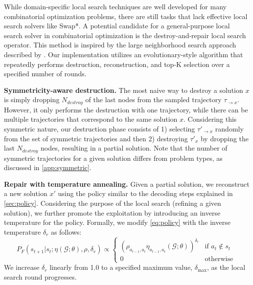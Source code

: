 \documentclass[twoside]{article}
\theoremstyle{plain}
\theoremstyle{definition}
\theoremstyle{remark}
\begin{document}
While domain-specific local search techniques are well developed for many combinatorial optimization problems, there are still tasks that lack effective local search solvers like Swap*. A potential candidate for a general-purpose local search solver in combinatorial optimization is the destroy-and-repair local search operator. This method is inspired by the large neighborhood search approach described by \citet{pisinger2019large}. Our implementation utilizes an evolutionary-style algorithm that repeatedly performs destruction, reconstruction, and top-K selection over a specified number of rounds.

\textbf{Symmetricity-aware destruction.} The most naive way to destroy a solution $x$ is simply dropping $N_{destroy}$ of the last nodes from the sampled trajectory $\tau_{\to x}$. However, it only performs the destruction with one trajectory, while there can be multiple trajectories that correspond to the same solution $x$. Considering this symmetric nature, our destruction phase consists of 1) selecting $\tau'_{\to x}$ randomly from the set of symmetric trajectories and then 2) destroying $\tau'_{x}$ by dropping the last $N_{destroy}$ nodes, resulting in a partial solution. Note that the number of symmetric trajectories for a given solution differs from problem types, as discussed in \cref{app:symmetric}.

\textbf{Repair with temperature annealing.} Given a partial solution, we reconstruct a new solution $x'$ using the policy similar to the decoding steps explained in \cref{sec:policy}. Considering the purpose of the local search (refining a given solution), we further promote the exploitation by introducing an inverse temperature for the policy. Formally, we modify \cref{eq:policy} with the inverse temperature $\delta_r$ as follows:
\begin{equation}
    P_F(s_{t+1}|s_t; \eta(\mathcal{G};\theta), \rho, \delta_r)
    \propto \begin{cases} \left( \rho_{a_{t-1},a_{t}}\eta_{a_{t-1},a_{t}}(\mathcal{G}; \theta)\right)^{\delta_r} & \text{if $a_t \notin s_{t}$ }\\ 0 & \text{otherwise} \end{cases}
\end{equation}
We increase $\delta_r$ linearly from 1.0 to a specified maximum value, $\delta_{\text{max}}$, as the local search round progresses.
\end{document}
